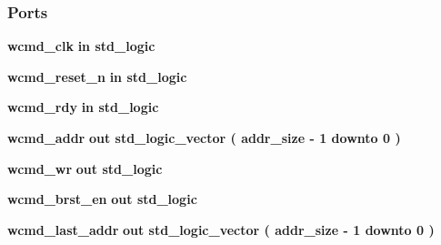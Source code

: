 \subsubsection*{Ports}
 \begin{DoxyCompactItemize}
\item 
{\bf wcmd\+\_\+clk}  {\bfseries {\bfseries \textcolor{keywordflow}{in}\textcolor{vhdlchar}{ }}} {\bfseries \textcolor{comment}{std\+\_\+logic}\textcolor{vhdlchar}{ }} 
\item 
{\bf wcmd\+\_\+reset\+\_\+n}  {\bfseries {\bfseries \textcolor{keywordflow}{in}\textcolor{vhdlchar}{ }}} {\bfseries \textcolor{comment}{std\+\_\+logic}\textcolor{vhdlchar}{ }} 
\item 
{\bf wcmd\+\_\+rdy}  {\bfseries {\bfseries \textcolor{keywordflow}{in}\textcolor{vhdlchar}{ }}} {\bfseries \textcolor{comment}{std\+\_\+logic}\textcolor{vhdlchar}{ }} 
\item 
{\bf wcmd\+\_\+addr}  {\bfseries {\bfseries \textcolor{keywordflow}{out}\textcolor{vhdlchar}{ }}} {\bfseries \textcolor{comment}{std\+\_\+logic\+\_\+vector}\textcolor{vhdlchar}{ }\textcolor{vhdlchar}{(}\textcolor{vhdlchar}{ }\textcolor{vhdlchar}{ }\textcolor{vhdlchar}{ }\textcolor{vhdlchar}{ }{\bfseries {\bf addr\+\_\+size}} \textcolor{vhdlchar}{-\/}\textcolor{vhdlchar}{ } \textcolor{vhdldigit}{1} \textcolor{vhdlchar}{ }\textcolor{keywordflow}{downto}\textcolor{vhdlchar}{ }\textcolor{vhdlchar}{ } \textcolor{vhdldigit}{0} \textcolor{vhdlchar}{ }\textcolor{vhdlchar}{)}\textcolor{vhdlchar}{ }} 
\item 
{\bf wcmd\+\_\+wr}  {\bfseries {\bfseries \textcolor{keywordflow}{out}\textcolor{vhdlchar}{ }}} {\bfseries \textcolor{comment}{std\+\_\+logic}\textcolor{vhdlchar}{ }} 
\item 
{\bf wcmd\+\_\+brst\+\_\+en}  {\bfseries {\bfseries \textcolor{keywordflow}{out}\textcolor{vhdlchar}{ }}} {\bfseries \textcolor{comment}{std\+\_\+logic}\textcolor{vhdlchar}{ }} 
\item 
{\bf wcmd\+\_\+last\+\_\+addr}  {\bfseries {\bfseries \textcolor{keywordflow}{out}\textcolor{vhdlchar}{ }}} {\bfseries \textcolor{comment}{std\+\_\+logic\+\_\+vector}\textcolor{vhdlchar}{ }\textcolor{vhdlchar}{(}\textcolor{vhdlchar}{ }\textcolor{vhdlchar}{ }\textcolor{vhdlchar}{ }\textcolor{vhdlchar}{ }{\bfseries {\bf addr\+\_\+size}} \textcolor{vhdlchar}{-\/}\textcolor{vhdlchar}{ } \textcolor{vhdldigit}{1} \textcolor{vhdlchar}{ }\textcolor{keywordflow}{downto}\textcolor{vhdlchar}{ }\textcolor{vhdlchar}{ } \textcolor{vhdldigit}{0} \textcolor{vhdlchar}{ }\textcolor{vhdlchar}{)}\textcolor{vhdlchar}{ }} 

\end{DoxyCompactItemize}
